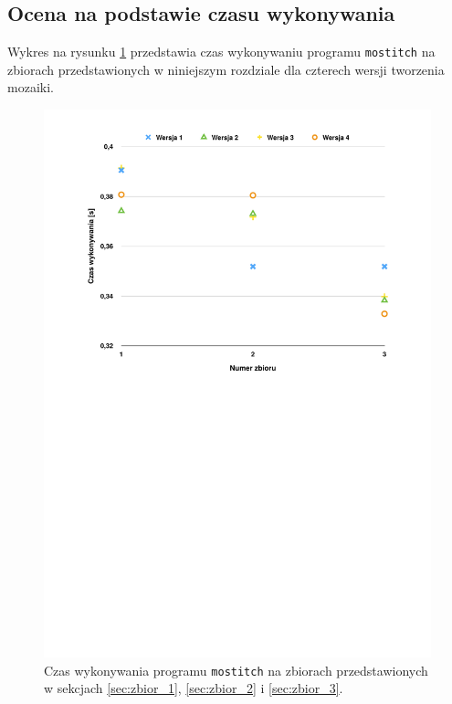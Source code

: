 \subsection{Ocena na podstawie czasu wykonywania}
\label{sec:wyniki_eksperymentow:czas_wykonywania}

Wykres na rysunku \ref{fig:wyniki_eksperymentow:czas_wykonywania} przedstawia czas wykonywaniu programu \texttt{mostitch} na zbiorach przedstawionych w niniejszym rozdziale dla czterech wersji tworzenia mozaiki.

\begin{figure}[htb]
  \centering
  \includegraphics[width=\textwidth]{gfx/czas_wykonywania}
  \caption{Czas wykonywania programu \texttt{mostitch} na zbiorach przedstawionych w sekcjach \ref{sec:zbior_1}, \ref{sec:zbior_2} i \ref{sec:zbior_3}.}
  \label{fig:wyniki_eksperymentow:czas_wykonywania}
\end{figure}

